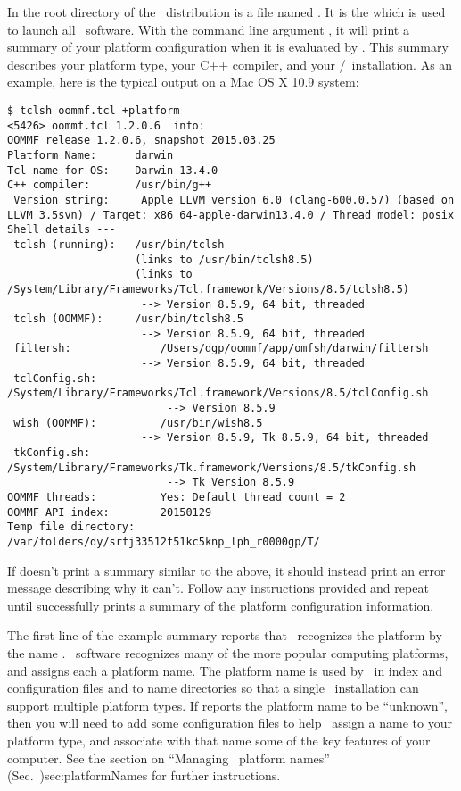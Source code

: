 In the root directory of the \OOMMF\ distribution is a file
named .  It is the 
which is used to launch all \OOMMF\ software.  With the command line
argument , 
it will print a summary of your
platform configuration when it is evaluated by .
This summary describes your platform type, your C++ compiler,
and your \Tcl/\Tk\ installation.  As an example, 
here is the typical output on a Mac OS X 10.9 system:
\begin{verbatim}
$ tclsh oommf.tcl +platform
<5426> oommf.tcl 1.2.0.6  info:
OOMMF release 1.2.0.6, snapshot 2015.03.25
Platform Name:		darwin
Tcl name for OS:	Darwin 13.4.0
C++ compiler:   	/usr/bin/g++ 
 Version string:	 Apple LLVM version 6.0 (clang-600.0.57) (based on LLVM 3.5svn) / Target: x86_64-apple-darwin13.4.0 / Thread model: posix
Shell details ---
 tclsh (running): 	/usr/bin/tclsh
                  	(links to /usr/bin/tclsh8.5)
                  	(links to /System/Library/Frameworks/Tcl.framework/Versions/8.5/tclsh8.5)
                  	 --> Version 8.5.9, 64 bit, threaded
 tclsh (OOMMF): 	/usr/bin/tclsh8.5
                  	 --> Version 8.5.9, 64 bit, threaded
 filtersh:           	/Users/dgp/oommf/app/omfsh/darwin/filtersh
                  	 --> Version 8.5.9, 64 bit, threaded
 tclConfig.sh:        	/System/Library/Frameworks/Tcl.framework/Versions/8.5/tclConfig.sh
                      	 --> Version 8.5.9
 wish (OOMMF):        	/usr/bin/wish8.5
                  	 --> Version 8.5.9, Tk 8.5.9, 64 bit, threaded
 tkConfig.sh:         	/System/Library/Frameworks/Tk.framework/Versions/8.5/tkConfig.sh
                      	 --> Tk Version 8.5.9
OOMMF threads:         	Yes: Default thread count = 2
OOMMF API index:       	20150129
Temp file directory: 	/var/folders/dy/srfj33512f51kc5knp_lph_r0000gp/T/
\end{verbatim}

If  doesn't print a summary similar to the
above, it should instead print an error message describing why it can't.
Follow any instructions provided
and repeat until  successfully prints a summary
of the platform configuration information.

The first line of the example summary reports that \OOMMF\ recognizes
the platform by the name .  \OOMMF\ software recognizes many
of the more popular computing platforms, and assigns each a platform
name.  The platform name is used by \OOMMF\ in index and configuration
files and to name directories so that a single \OOMMF\ installation can
support multiple platform types.  If  reports
the platform name to be ``unknown'', then you will need to add some
configuration files to help \OOMMF\ assign a name to your platform type,
and associate with that name some of the key features of your computer.
See the section on
{``Managing \OOMMF\ platform names'' (Sec.~}{)}{sec:platformNames}
for further instructions.

